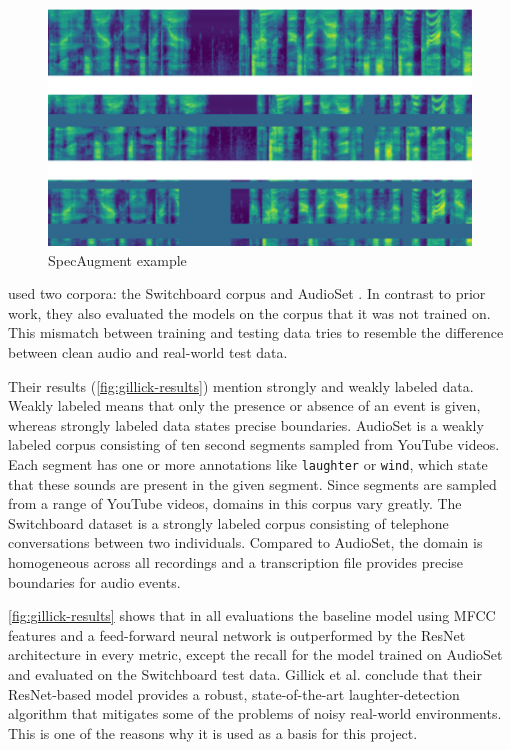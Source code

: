 \documentclass[bsc,frontabs,parskip,deptreport]{infthesis}
\begin{document}
\begin{figure}[h!]
    \centering
    \includegraphics[width=13cm]{imgs/examples/spec_augment_example.png}
    \caption{SpecAugment example}
    \label{fig:spec-augment}
\end{figure}

\citet{gillick2021robust} used two corpora: the Switchboard corpus \citep{switchboard-corpus} and AudioSet \citep{googleaudioset}.
In contrast to prior work, they also evaluated the models on the corpus that it was not trained on.
This mismatch between training and testing data tries to resemble the difference between clean audio and real-world test data.

Their results (\autoref{fig:gillick-results}) mention strongly and weakly labeled data.
Weakly labeled means that only the presence or absence of an event is given, whereas strongly labeled data states precise boundaries.
AudioSet \citep{googleaudioset} is a weakly labeled corpus consisting of ten second segments sampled from YouTube videos. Each segment has one or more annotations like \texttt{laughter} or \texttt{wind}, which state that these sounds are present in the given segment. Since segments are sampled from a range of YouTube videos, domains in this corpus vary greatly.
The Switchboard dataset is a strongly labeled corpus consisting of telephone conversations between two individuals. Compared to AudioSet, the domain is homogeneous across all recordings and a transcription file provides precise boundaries for audio events.

\autoref{fig:gillick-results} shows that in all evaluations the baseline model using MFCC features and a feed-forward neural network is outperformed by the ResNet architecture in every metric, except the recall for the model trained on AudioSet and evaluated on the Switchboard test data. 
Gillick et al. conclude that their ResNet-based model provides a robust, state-of-the-art laughter-detection algorithm that mitigates some of the problems of noisy real-world environments. This is one of the reasons why it is used as a basis for this project.
\end{document}
